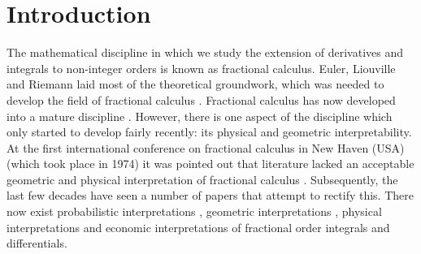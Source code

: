 \documentclass[twoside,reqno,11pt]{fcaa-var} %
\begin{document}
% 
% 
% 
% 
% 
% 
% 
% 
 
\section{Introduction}

\noindent
The mathematical discipline in which we study the extension of derivatives and integrals to non-integer orders is known as fractional calculus. Euler, Liouville and Riemann laid most 
of the theoretical groundwork, which was needed to develop the field of fractional calculus \cite{laurent1884}. Fractional calculus has now developed into a mature discipline \cite{machado17}. 
However, there is one aspect of the discipline which only started to develop fairly recently: its physical and geometric interpretability. At the first international conference on fractional calculus in
New Haven (USA) (which took place in 1974) it was pointed out that literature lacked an acceptable geometric and physical interpretation of fractional calculus \cite{ross06}. Subsequently, the last few decades have seen 
a number of papers that attempt to rectify this. There now exist probabilistic interpretations \cite{machado03,stanislavsky04}, geometric interpretations \cite{adda97,garcia2019,podlubny02,tarasov16}, physical interpretations \cite{rutman95, nigmatullin92} and economic 
interpretations \cite{tarasova17} of fractional order integrals and differentials.\\
\end{document}
